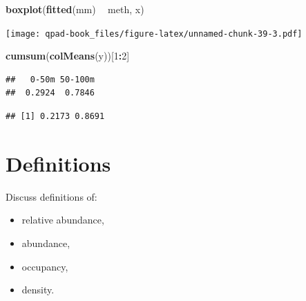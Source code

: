 \documentclass[12pt,]{book}
\newenvironment{Shaded}{\begin{snugshade}}{\end{snugshade}}
\newcommand{\CommentTok}[1]{\textcolor[rgb]{0.56,0.35,0.01}{\textit{#1}}}
\newcommand{\DecValTok}[1]{\textcolor[rgb]{0.00,0.00,0.81}{#1}}
\newcommand{\FloatTok}[1]{\textcolor[rgb]{0.00,0.00,0.81}{#1}}
\newcommand{\KeywordTok}[1]{\textcolor[rgb]{0.13,0.29,0.53}{\textbf{#1}}}
\newcommand{\NormalTok}[1]{#1}
\newcommand{\OperatorTok}[1]{\textcolor[rgb]{0.81,0.36,0.00}{\textbf{#1}}}
\newcommand{\StringTok}[1]{\textcolor[rgb]{0.31,0.60,0.02}{#1}}
\providecommand{\tightlist}{%
  \setlength{\itemsep}{0pt}\setlength{\parskip}{0pt}}
\begin{document}
\begin{Shaded}
\begin{Highlighting}[]
\KeywordTok{boxplot}\NormalTok{(}\KeywordTok{fitted}\NormalTok{(mm) }\OperatorTok{~}\StringTok{ }\NormalTok{meth, x)}
\end{Highlighting}
\end{Shaded}

\texttt{[image: qpad-book\_files/figure-latex/unnamed-chunk-39-3.pdf]}

\begin{Shaded}
\begin{Highlighting}[]
\KeywordTok{cumsum}\NormalTok{(}\KeywordTok{colMeans}\NormalTok{(y))[}\DecValTok{1}\OperatorTok{:}\DecValTok{2}\NormalTok{]}
\end{Highlighting}
\end{Shaded}

\begin{verbatim}
##   0-50m 50-100m 
##  0.2924  0.7846
\end{verbatim}

\begin{Shaded}
\end{Shaded}

\begin{verbatim}
## [1] 0.2173 0.8691
\end{verbatim}

\hypertarget{definitions}{%
\section{Definitions}\label{definitions}}

Discuss definitions of:

\begin{itemize}
\tightlist
\item
  relative abundance,
\item
  abundance,
\item
  occupancy,
\item
  density.
\end{itemize}
\end{document}
